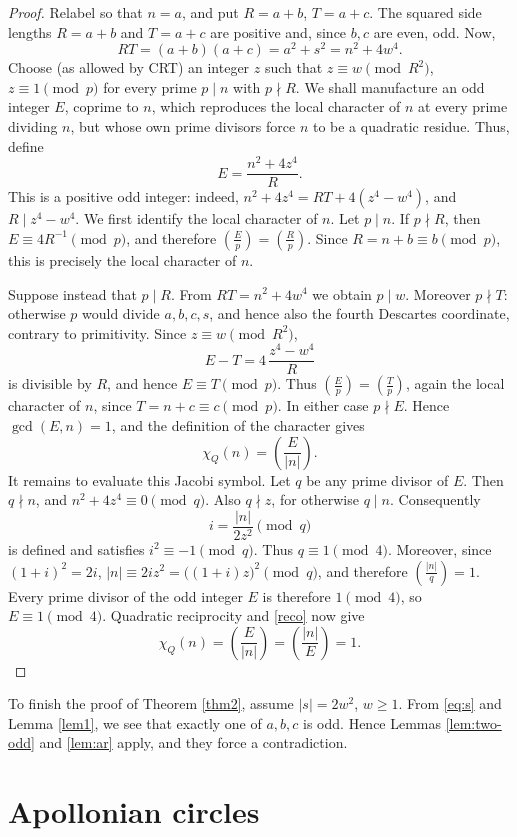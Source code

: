 \documentclass[12pt]{article}
\theoremstyle{definition}
\theoremstyle{remark}
\newcommand{\symb}[2]{\left(\frac{#1}{#2}\right)}
\begin{document}
\begin{proof}
	Relabel so that $n=a$, and put $R=a+b$, $T=a+c$. 
	The squared side lengths \(R=a+b\) and \(T=a+c\) are positive and, since \(b,c\) are even, odd. Now,
	\[
	RT=(a+b)(a+c)=a^2+s^2=n^2+4w^4.
	\]
Choose (as allowed by CRT) an integer $z$ such that	$z\equiv w\pmod{R^2}$, $z\equiv1\pmod p$ for every prime $p\mid n$ with $p\nmid R$. We shall manufacture an odd integer \(E\), coprime to \(n\), which reproduces the local character of \(n\) at every prime dividing \(n\), but whose own prime divisors force \(n\) to be a quadratic residue. Thus, define
	\[
	E=\frac{n^2+4z^4}{R}.
	\]
This is a positive odd integer: indeed,	$n^2+4z^4=RT+4(z^4-w^4)$, and $R\mid z^4-w^4$. We first identify the local character of $n$. Let $p\mid n$. If $p\nmid R$, then $E\equiv4R^{-1}\pmod p$, and therefore $\symb{E}{p}=\symb{R}{p}$. Since $R=n+b\equiv b\pmod p$, this is precisely the local character of $n$.
	
Suppose instead that $p\mid R$. From $RT=n^2+4w^4$ we obtain $p\mid w$. Moreover $p\nmid T$: otherwise $p$ would divide $a,b,c,s$, and hence also the fourth Descartes coordinate, contrary to primitivity. Since $z\equiv w\pmod{R^2}$,
	\[
	E-T=4\,\frac{z^4-w^4}{R}
	\]
is divisible by $R$, and hence $E\equiv T\pmod p$. Thus $\symb{E}{p}=\symb{T}{p}$, again the local character of $n$, since $T=n+c\equiv c\pmod p$. In either case $p\nmid E$. Hence $\gcd(E,n)=1$, and the definition of the character gives
	\begin{equation}
	\chi_Q(n)=\symb{E}{|n|}.                     
	\label{reco}
	\end{equation}
	It remains to evaluate this Jacobi symbol. Let $q$ be any prime divisor
	of $E$. Then $q\nmid n$, and $n^2+4z^4\equiv0\pmod q$. Also $q\nmid z$, for otherwise $q\mid n$. Consequently
	\[
	i=\frac{|n|}{2z^2}\pmod q
	\]
is defined and satisfies $i^2\equiv-1\pmod q$. Thus $q\equiv1\pmod4$. Moreover, since $(1+i)^2=2i$, $|n|\equiv2iz^2=\bigl((1+i)z\bigr)^2\pmod q$, and therefore $\symb{|n|}{q}=1$. Every prime divisor of the odd integer $E$ is therefore $1\pmod4$, so $E\equiv1\pmod4$. Quadratic reciprocity and \eqref{reco} now give
	\[
	\chi_Q(n)
	=\symb{E}{|n|}
	=\symb{|n|}{E}
	=1.
	\]
\end{proof}
To finish the proof of Theorem \ref{thm2}, assume $|s|=2w^2$, $w\geq 1$. From \eqref{eq:s} and Lemma \ref{lem1}, we see that exactly one of $a,b,c$ is odd. Hence Lemmas \ref{lem:two-odd} and \ref{lem:ar} apply, and they force a contradiction.
\section{Apollonian circles}\label{relations}
\end{document}
